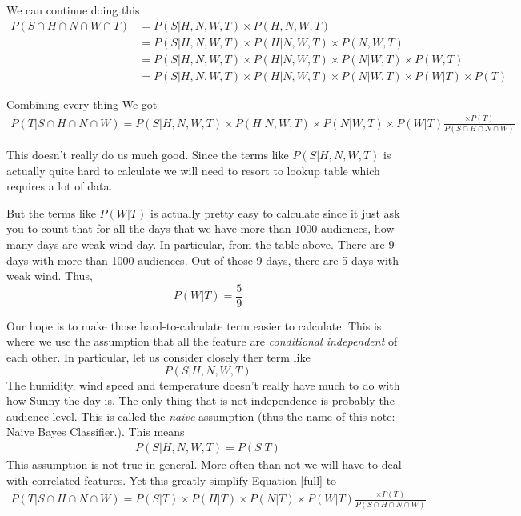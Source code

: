 \documentclass[a4paper, 12pt]{article}
\begin{document}
We can continue doing this 
\begin{align}
P(S \cap H \cap N\cap W \cap T) &= P(S | H,N,W,T) \times P(H, N, W, T) \\
&= P(S | H,N,W,T) \times P(H| N, W, T) \times P(N, W, T)\\
&= P(S | H,N,W,T) \times P(H| N, W, T) \times P(N| W, T) \times P(W, T)\\
&= P(S | H,N,W,T) \times P(H| N, W, T) \times P(N| W, T) \times P(W| T) \times P(T)
\end{align}

Combining every thing We got
\begin{align}
P(T | S \cap H \cap N\cap W) = P(S | H,N,W,T) \times P(H| N, W, T) \times P(N| W, T) \times P(W| T) \frac{\times P(T)}{P(S \cap H \cap N\cap W)}
\label{full}
\end{align}

This doesn't really do us much good. Since the terms like $P(S | H,N,W,T)$ is actually quite hard to calculate we will need to resort to lookup table which requires a lot of data.

But the terms like $P(W | T)$ is actually pretty easy to calculate since it just ask you to count that for all the days that we have more than $\num{1000}$ audiences, how many days are weak wind day. In particular, from the table above. There are 9 days with more than \num{1000} audiences. Out of those 9 days, there are 5 days with weak wind. Thus,
\begin{equation}
P(W | T) = \frac{5}{9}
\end{equation}

Our hope is to make those hard-to-calculate term easier to calculate. This is where we use the assumption that all the feature are \emph{conditional independent} of each other. In particular, let us consider closely ther term like
\[
	P(S | H, N, W, T)
\]
The humidity, wind speed and temperature doesn't really have much to do with how Sunny the day is. The only thing that is not independence is probably the audience level. This is called the \emph{naive} assumption (thus the name of this note: Naive Bayes Classifier.). This means
\begin{align}
	P(S | H, N, W, T) = P (S | T)
\end{align}
This assumption is not true in general. More often than not we will have to deal with correlated features. Yet this greatly simplify Equation \ref{full} to
\begin{align}
P(T | S \cap H \cap N\cap W) = P(S | T) \times P(H| T) \times P(N| T) \times P(W| T) \frac{\times P(T)}{P(S \cap H \cap N\cap W)}
\end{align}
\end{document}
